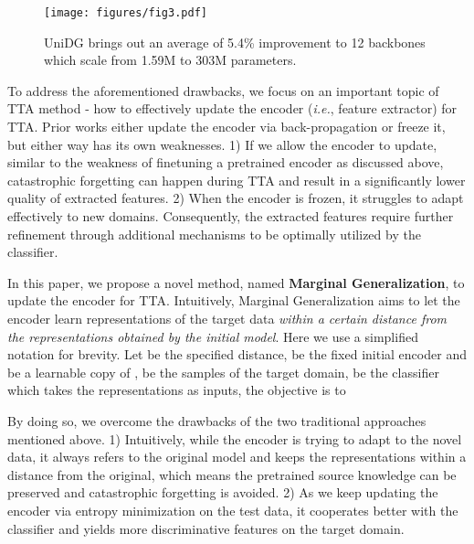 \documentclass{article} \usepackage{iclr2024_conference,times}
\begin{document}
    \begin{wrapfigure}{l}[0cm]{0pt}
    \begin{minipage}{0.48\linewidth}
    \vspace{-5.5mm}
    \texttt{[image: figures/fig3.pdf]}
    \vspace{-5.5mm}
    \caption{UniDG brings out an average of 5.4\% improvement to 12 backbones which scale from 1.59M to 303M parameters.}
    \label{fig:backbone}
    \vspace{-5mm}
    \end{minipage}
    \end{wrapfigure}
 To address the aforementioned drawbacks, we focus on an important topic of TTA method - how to effectively update the encoder (\textit{i.e.}, feature extractor) for TTA. Prior works either update the encoder via back-propagation or freeze it, but either way has its own weaknesses. 1) If we allow the encoder to update, similar to the weakness of finetuning a pretrained encoder as discussed above, catastrophic forgetting can happen during TTA and result in a significantly lower quality of extracted features. 2) When the encoder is frozen, it struggles to adapt effectively to new domains. Consequently, the extracted features require further refinement through additional mechanisms to be optimally utilized by the classifier.

 

 In this paper, we propose a novel method, named \textbf{Marginal Generalization}, to update the encoder for TTA. Intuitively, Marginal Generalization aims to let the encoder learn representations of the target data \emph{within a certain distance from the representations obtained by the initial model}. Here we use a simplified notation for brevity. Let  be the specified distance,  be the fixed initial encoder and  be a learnable copy of ,  be the samples of the target domain,  be the classifier which takes the representations  as inputs, the objective is to
    


By doing so, we overcome the drawbacks of the two traditional approaches mentioned above. 
1) Intuitively, while the encoder  is trying to adapt to the novel data, it always refers to the original model  and keeps the representations within a distance  from the original, which means the pretrained source knowledge can be preserved and catastrophic forgetting is avoided. 2) As we keep updating the encoder via entropy minimization on the test data, it cooperates better with the classifier and yields more discriminative features on the target domain.
\end{document}
